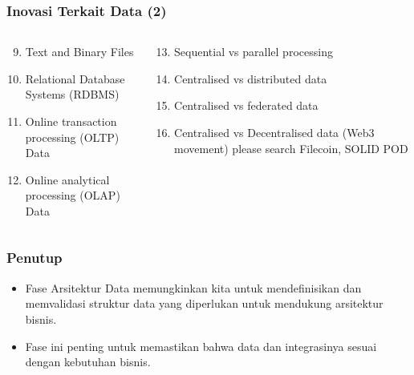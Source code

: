 \documentclass[aspectratio=169, table]{beamer}
\begin{document}
		\begin{frame}
		\frametitle{Inovasi Terkait Data (2)}
		\begin{columns}
			\begin{column}{0.5\textwidth}
				\begin{center}
					\begin{enumerate}
						\setcounter{enumi}{8}
						\item Text and Binary Files
						\item Relational Database Systems (RDBMS)
						\item Online transaction processing (OLTP) Data
						\item Online analytical processing (OLAP) Data
					\end{enumerate}
				\end{center}
			\end{column}
			\begin{column}{0.5\textwidth}
				\begin{center}
					\begin{enumerate}
						\setcounter{enumi}{12}
						\item Sequential vs parallel processing
						\item Centralised vs distributed data
						\item Centralised vs federated data
						\item Centralised vs Decentralised data (Web3 movement) please search Filecoin, SOLID POD
					\end{enumerate}
				\end{center}
			\end{column}
		\end{columns}
	\end{frame}



	\begin{frame}
		\frametitle{Penutup}
		\begin{itemize}
			\item Fase Arsitektur Data memungkinkan kita untuk mendefinisikan dan memvalidasi struktur data yang diperlukan untuk mendukung arsitektur bisnis.
			\item Fase ini penting untuk memastikan bahwa data dan integrasinya sesuai dengan kebutuhan bisnis.
		\end{itemize}
	\end{frame}
\end{document}
